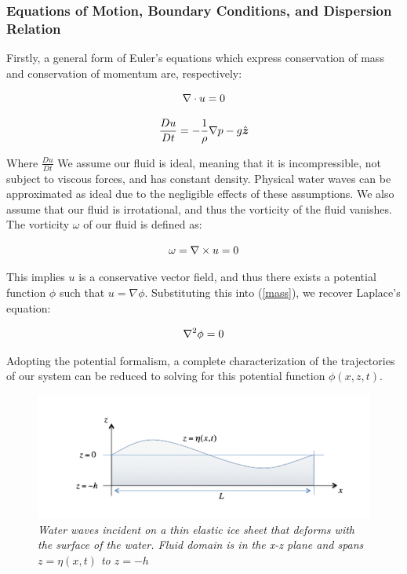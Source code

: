 \documentclass{article}
\begin{document}
  \subsubsection{Equations of Motion, Boundary Conditions, and Dispersion Relation}
  
  
  Firstly, a general form of Euler's equations which express conservation of mass and conservation of momentum are, respectively:
  
  \begin{equation} \label{mass}
  \nabla \cdot u = 0  \\
\end{equation}

\begin{equation} \label{eq1}
  \frac{D u}{D t} = -\frac{1}{\rho}\nabla p 
  -g \hat{\boldsymbol{z}}  \\
  \end{equation}

 Where \(\frac{D u}{D t}\) We assume our fluid is ideal, meaning that it is incompressible, not subject to viscous forces, and has constant density. Physical water waves can be approximated as ideal due to the negligible effects of these assumptions. We also assume that our fluid is irrotational, and thus the vorticity of the fluid vanishes.
 The vorticity \( \omega \) of our fluid is defined as:
 
   \begin{equation} \label{eqn3}
  \omega = \nabla \times u = 0  \\
\end{equation}
  
This implies \(u\) is a conservative vector field, and thus there exists a potential function \(\phi\) such that \( u = \nabla \phi\). Substituting this into (\ref{mass}), we recover Laplace's equation: 

 \begin{equation} \label{laplace}
  \nabla^2 \phi = 0  \\
\end{equation}
 
Adopting the potential formalism, a complete characterization of the trajectories of our system can be reduced to solving for this potential function \(\phi(x,z,t)\). 

\begin{figure}[htp] \label{wavesindeed}
\centering
\includegraphics[scale = .9]{WaterPicture.png}
\caption{ \emph{Water waves incident on a thin elastic ice sheet that deforms with the surface of the water. Fluid domain is in the x-z plane and spans \(z=\eta(x,t)\) to \(z=-h\)}}
\end{figure}
  
\end{document}
